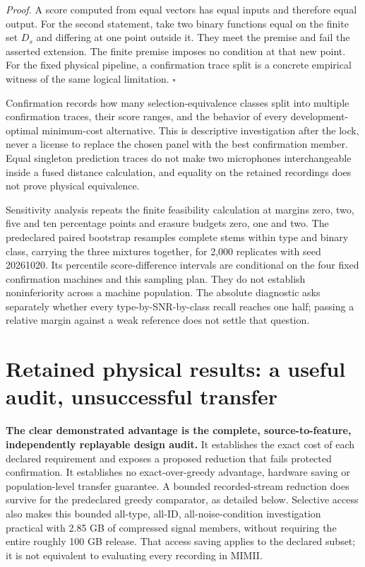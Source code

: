\documentclass[
  11pt,
  a4paper,
]{report}
\begin{document}
\emph{Proof.} A score computed from equal vectors has equal inputs and
therefore equal output. For the second statement, take two binary
functions equal on the finite set \(D_s\) and differing at one point
outside it. They meet the premise and fail the asserted extension. The
finite premise imposes no condition at that new point. For the fixed
physical pipeline, a confirmation trace split is a concrete empirical
witness of the same logical limitation. \(\square\)

Confirmation records how many selection-equivalence classes split into
multiple confirmation traces, their score ranges, and the behavior of
every development-optimal minimum-cost alternative. This is descriptive
investigation after the lock, never a license to replace the chosen
panel with the best confirmation member. Equal singleton prediction
traces do not make two microphones interchangeable inside a fused
distance calculation, and equality on the retained recordings does not
prove physical equivalence.

Sensitivity analysis repeats the finite feasibility calculation at
margins zero, two, five and ten percentage points and erasure budgets
zero, one and two. The predeclared paired bootstrap resamples complete
stems within type and binary class, carrying the three mixtures
together, for 2,000 replicates with seed 20261020. Its percentile
score-difference intervals are conditional on the four fixed
confirmation machines and this sampling plan. They do not establish
noninferiority across a machine population. The absolute diagnostic asks
separately whether every type-by-SNR-by-class recall reaches one half;
passing a relative margin against a weak reference does not settle that
question.

\hypertarget{retained-physical-results-a-useful-audit-unsuccessful-transfer}{%
\section{Retained physical results: a useful audit, unsuccessful
transfer}\label{retained-physical-results-a-useful-audit-unsuccessful-transfer}}

\textbf{The clear demonstrated advantage is the complete,
source-to-feature, independently replayable design audit.} It
establishes the exact cost of each declared requirement and exposes a
proposed reduction that fails protected confirmation. It establishes no
exact-over-greedy advantage, hardware saving or population-level
transfer guarantee. A bounded recorded-stream reduction does survive for
the predeclared greedy comparator, as detailed below. Selective access
also makes this bounded all-type, all-ID, all-noise-condition
investigation practical with 2.85 GB of compressed signal members,
without requiring the entire roughly 100 GB release. That access saving
applies to the declared subset; it is not equivalent to evaluating every
recording in MIMII.
\end{document}
